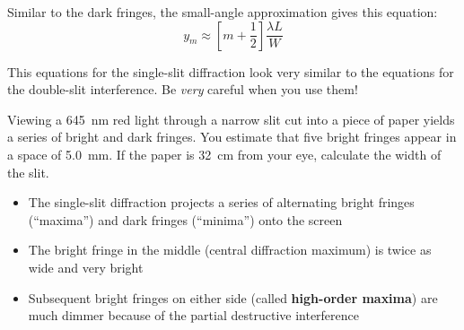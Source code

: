Similar to the dark fringes, the small-angle approximation gives this
equation:
\begin{equation}
  \boxed{y_m\approx\left[m+\frac12\right]\frac{\lambda L}W}
\end{equation}

\begin{remark}
  This equations for the single-slit diffraction look very similar to the
  equations for the double-slit interference. Be \emph{very} careful when you
  use them!
\end{remark}

\begin{example}
  Viewing a \SI{645}{\nano\metre} red light through a narrow slit cut into a
  piece of paper yields a series of bright and dark fringes. You estimate that
  five bright fringes appear in a space of \SI{5.0}{\milli\metre}. If the paper
  is \SI{32}{\centi\metre} from your eye, calculate the width of the slit.
\end{example}






\begin{itemize}
\item The single-slit diffraction projects a series of alternating bright
  fringes (``maxima'') and dark fringes (``minima'') onto the screen
\item The bright fringe in the middle (central diffraction maximum) is
  twice as wide and very bright
\item Subsequent bright fringes on either side (called
  \textbf{high-order maxima}) are
  much dimmer because of the partial destructive interference
\end{itemize}
\begin{center}
\end{center}



